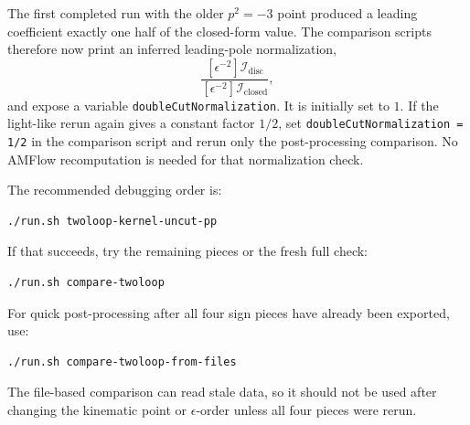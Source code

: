 \documentclass[11pt]{article}
\newcommand{\eps}{\epsilon}
\newcommand{\WL}[1]{\texttt{#1}}
\begin{document}
The first completed run with the older \(p^2=-3\) point produced a leading
coefficient exactly one half of the closed-form value. The comparison scripts
therefore now print an inferred leading-pole normalization,
\begin{equation}
  \frac{[\eps^{-2}]\mathcal I_{\mathrm{disc}}}
       {[\eps^{-2}]\mathcal I_{\mathrm{closed}}},
\end{equation}
and expose a variable \WL{doubleCutNormalization}. It is initially set to
\(1\). If the light-like rerun again gives a constant factor \(1/2\), set
\WL{doubleCutNormalization = 1/2} in the comparison script and rerun only the
post-processing comparison. No AMFlow recomputation is needed for that
normalization check.

The recommended debugging order is:
\begin{verbatim}
./run.sh twoloop-kernel-uncut-pp
\end{verbatim}
If that succeeds, try the remaining pieces or the fresh full check:
\begin{verbatim}
./run.sh compare-twoloop
\end{verbatim}
For quick post-processing after all four sign pieces have already been
exported, use:
\begin{verbatim}
./run.sh compare-twoloop-from-files
\end{verbatim}
The file-based comparison can read stale data, so it should not be used after
changing the kinematic point or \(\eps\)-order unless all four pieces were
rerun.
\end{document}
